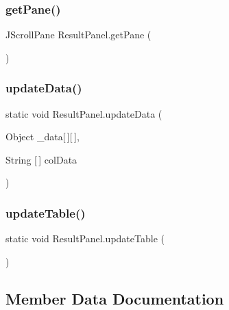 \hypertarget{class_result_panel_ace0f4c9bd2c1ddadc0e0484ac9da3d2b}{}\label{class_result_panel_ace0f4c9bd2c1ddadc0e0484ac9da3d2b} 
\subsubsection{\texorpdfstring{get\+Pane()}{getPane()}}
{\footnotesize\ttfamily J\+Scroll\+Pane Result\+Panel.\+get\+Pane (\begin{DoxyParamCaption}{ }\end{DoxyParamCaption})}

\hypertarget{class_result_panel_a46714631f37ba703978bdd94e6a666d3}{}\label{class_result_panel_a46714631f37ba703978bdd94e6a666d3} 
\subsubsection{\texorpdfstring{update\+Data()}{updateData()}}
{\footnotesize\ttfamily static void Result\+Panel.\+update\+Data (\begin{DoxyParamCaption}\item[{Object}]{\+\_\+data\mbox{[}$\,$\mbox{]}\mbox{[}$\,$\mbox{]},  }\item[{String \mbox{[}$\,$\mbox{]}}]{col\+Data }\end{DoxyParamCaption})\hspace{0.3cm}{\ttfamily [static]}}

\hypertarget{class_result_panel_a91bbedbe216c200121a25a629bdc6d2f}{}\label{class_result_panel_a91bbedbe216c200121a25a629bdc6d2f} 
\subsubsection{\texorpdfstring{update\+Table()}{updateTable()}}
{\footnotesize\ttfamily static void Result\+Panel.\+update\+Table (\begin{DoxyParamCaption}{ }\end{DoxyParamCaption})\hspace{0.3cm}{\ttfamily [static]}}



\subsection{Member Data Documentation}
\hypertarget{class_result_panel_ad2246ab66ef229df1e6d89d570e19364}{}\label{class_result_panel_ad2246ab66ef229df1e6d89d570e19364} 

